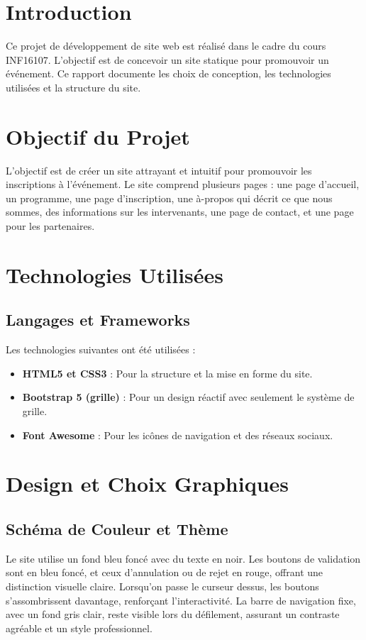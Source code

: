 \documentclass[12pt,twoside,letterpaper]{article}
\begin{document}
\begin{Large}


\tableofcontents
\newpage

\section{Introduction}
Ce projet de développement de site web est réalisé dans le cadre du cours INF16107. L’objectif est de concevoir un site statique pour promouvoir un événement. Ce rapport documente les choix de conception, les technologies utilisées et la structure du site. 

\section{Objectif du Projet}
L’objectif est de créer un site attrayant et intuitif pour promouvoir les inscriptions à l’événement. Le site comprend plusieurs pages : une page d'accueil, un programme, une page d'inscription, une à-propos qui décrit ce que nous sommes, des informations sur les intervenants, une page de contact, et une page pour les partenaires.

\section{Technologies Utilisées}
\subsection{Langages et Frameworks}
Les technologies suivantes ont été utilisées :
\begin{itemize}
    \item \textbf{HTML5 et CSS3} : Pour la structure et la mise en forme du site.
    \item \textbf{Bootstrap 5 (grille)} : Pour un design réactif avec seulement le système de grille.
    \item \textbf{Font Awesome} : Pour les icônes de navigation et des réseaux sociaux.
\end{itemize}

\section{Design et Choix Graphiques}
\subsection{Schéma de Couleur et Thème}
Le site utilise un fond bleu foncé avec du texte en noir. Les boutons de validation sont en bleu foncé, et ceux d'annulation ou de rejet en rouge, offrant une distinction visuelle claire. Lorsqu'on passe le curseur dessus, les boutons s'assombrissent davantage, renforçant l'interactivité. La barre de navigation fixe, avec un fond gris clair, reste visible lors du défilement, assurant un contraste agréable et un style professionnel.


\end{Large}
\end{document}
